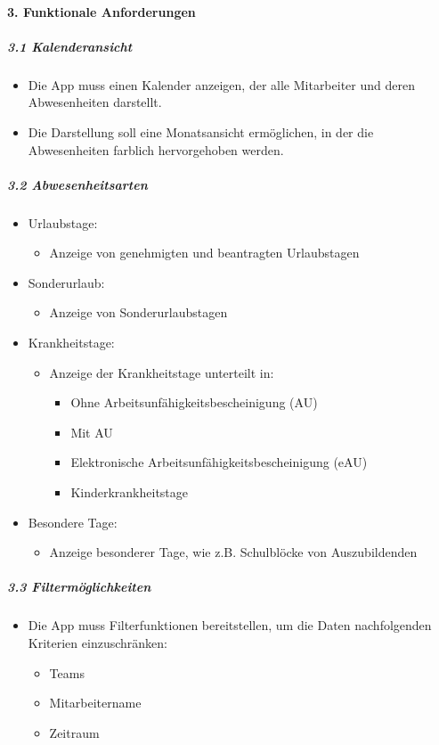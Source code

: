 \paragraph{3. Funktionale Anforderungen}
\label{Abwesenheitsarten}
\subparagraph{3.1 Kalenderansicht}
\begin{itemize}[noitemsep,topsep=0pt,parsep=0pt,partopsep=0pt]
    \item Die App muss einen Kalender anzeigen, der alle Mitarbeiter und deren Abwesenheiten darstellt.
    \item Die Darstellung soll eine Monatsansicht ermöglichen, in der die Abwesenheiten farblich hervorgehoben werden.
\end{itemize}
\subparagraph{3.2 Abwesenheitsarten}
\begin{itemize}[noitemsep,topsep=0pt,parsep=0pt,partopsep=0pt]
    \item Urlaubstage:
    \begin{itemize}
        \item Anzeige von genehmigten und beantragten Urlaubstagen
    \end{itemize}
    \item Sonderurlaub:
    \begin{itemize}
        \item Anzeige von Sonderurlaubstagen
    \end{itemize}
    \item Krankheitstage:
    \begin{itemize}
        \item Anzeige der Krankheitstage unterteilt in:
        \begin{itemize}
            \item Ohne Arbeitsunfähigkeitsbescheinigung (AU)
            \item Mit AU
            \item Elektronische Arbeitsunfähigkeitsbescheinigung (eAU)
            \item Kinderkrankheitstage
        \end{itemize}
    \end{itemize}
    \item Besondere Tage:
    \begin{itemize}
        \item Anzeige besonderer Tage, wie z.B. Schulblöcke von Auszubildenden
    \end{itemize}
\end{itemize}
\subparagraph{3.3 Filtermöglichkeiten}
\begin{itemize}
    \item Die App muss Filterfunktionen bereitstellen, um die Daten nachfolgenden Kriterien einzuschränken:
    \begin{itemize}
        \item Teams
        \item Mitarbeitername
        \item Zeitraum
    \end{itemize}
\end{itemize}
